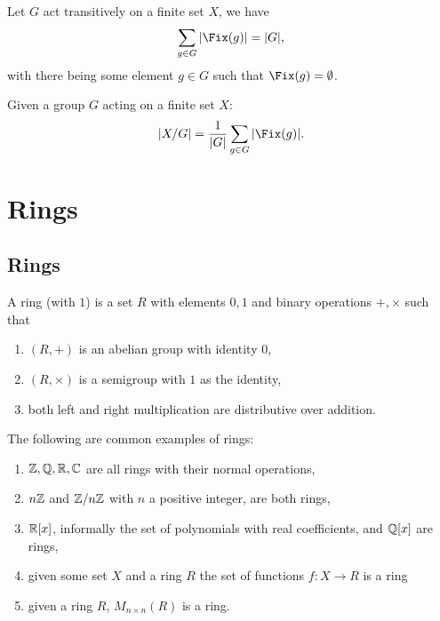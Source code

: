 \documentclass[../Year2.tex]{subfiles}
\begin{document}
\vspace{-20pt}

\begin{theorem}
    Let $G$ act transitively on a finite set $X$, we have \[
        \sum_{g\in G}|\Fix(g)| = |G|
    \black{,}
    \] with there being some element $g\in G$ such that $\Fix(g)=\emptyset$.
\end{theorem}

\begin{corollary}
    Given a group $G$ acting on a finite set $X$: \[
        |X/G| = \frac{1}{|G|}\sum_{g\in G}|\Fix(g)|
        \black{.}
    \]
\end{corollary}

\vspace{-30pt}

\section{Rings}

\subsection{Rings}

\begin{definition}[Ring]
    A ring (with $1$) is a set $R$ with elements $0,1$ and binary operations $+,\times$ such that \begin{enumerate}
        \item $(R,+)$ is an abelian group with identity $0$,
        \item $(R,\times)$ is a semigroup with $1$ as the identity,
        \item both left and right multiplication are distributive over addition.
    \end{enumerate}
\end{definition}

\begin{examples}
    The following are common examples of rings:
    \begin{enumerate}
        \item  $\mathbb{Z},\mathbb{Q},\mathbb{R},\mathbb{C}$ are all rings with their normal operations,
        \item $n\mathbb{Z}$ and $\mathbb{Z}/n\mathbb{Z}$ with $n$ a positive integer, are both rings,
        \item $\mathbb{R}[x]$, informally the set of polynomials with real coefficients, and $\mathbb{Q}[x]$ are rings,
        \item given some set $X$ and a ring $R$ the set of functions $f:X\rightarrow R$ is a ring
        \item given a ring $R$, $M_{n\times n}(R)$ is a ring.
    \end{enumerate}
\end{examples}
\end{document}
